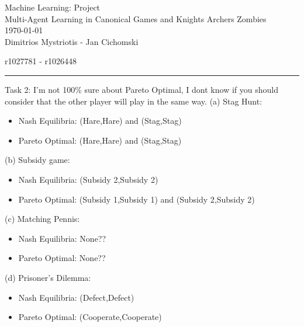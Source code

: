 \documentclass[12pt,letterpaper, onecolumn]{exam}
\begin{document}
\begingroup  
    \centering
    \LARGE Machine Learning: Project\\
    \LARGE Multi-Agent Learning in Canonical Games and Knights Archers Zombies\\[0.5em]
    \large \today\\[0.5em]
    \large Dimitrios Mystriotis - Jan Cichomski\par
    \large r1027781 - r1026448\par
\endgroup
\rule{\textwidth}{0.4pt}
\pointsdroppedatright   %
\printanswers
\renewcommand{\solutiontitle}{\noindent\textbf{Ans:}\enspace}   %


    


Task 2:
I'm not 100\% sure about Pareto Optimal, I dont know if you should consider that the other player will play in the same way.
(a) Stag Hunt:
\begin{itemize}
    \item Nash Equilibria: (Hare,Hare) and (Stag,Stag)
    \item Pareto Optimal: (Hare,Hare) and (Stag,Stag)
\end{itemize}
(b) Subsidy game:
\begin{itemize}
    \item Nash Equilibria: (Subsidy 2,Subsidy 2)
    \item Pareto Optimal: (Subsidy 1,Subsidy 1) and (Subsidy 2,Subsidy 2)
\end{itemize}
(c) Matching Pennis:
\begin{itemize}
    \item Nash Equilibria: None??
    \item Pareto Optimal: None??
\end{itemize}
(d) Prisoner's Dilemma:
\begin{itemize}
    \item Nash Equilibria: (Defect,Defect)
    \item Pareto Optimal: (Cooperate,Cooperate)
\end{itemize}
\end{document}
